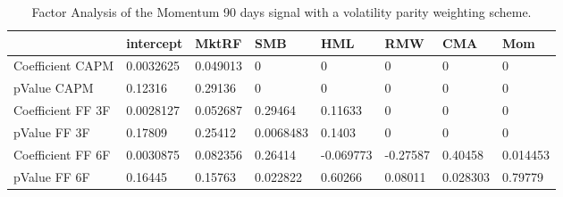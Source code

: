 \begin{table}[H]
\centering
\begin{tabular}{llllllll}
& intercept & MktRF & SMB & HML & RMW & CMA & Mom \\ 
\hline 
Coefficient CAPM & 0.0032625 & 0.049013 & 0 & 0 & 0 & 0 & 0 \\ 
pValue CAPM & 0.12316 & 0.29136 & 0 & 0 & 0 & 0 & 0 \\ 
Coefficient FF 3F & 0.0028127 & 0.052687 & 0.29464 & 0.11633 & 0 & 0 & 0 \\ 
pValue FF 3F & 0.17809 & 0.25412 & 0.0068483 & 0.1403 & 0 & 0 & 0 \\ 
Coefficient FF 6F & 0.0030875 & 0.082356 & 0.26414 & -0.069773 & -0.27587 & 0.40458 & 0.014453 \\ 
pValue FF 6F & 0.16445 & 0.15763 & 0.022822 & 0.60266 & 0.08011 & 0.028303 & 0.79779 \\ 
\hline
\end{tabular}
\caption{Factor Analysis of the Momentum 90 days signal with a volatility parity weighting scheme.}
\label{MOM90VP_FACTOR}
\end{table}